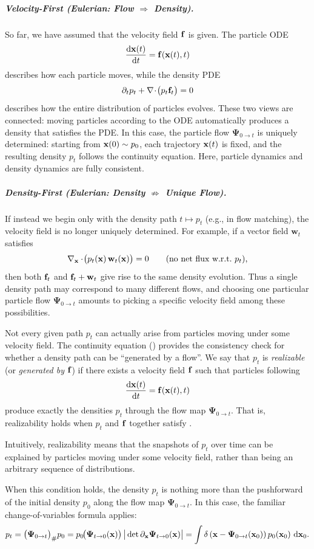 \subparagraph{Velocity-First (Eulerian: Flow $\Rightarrow$ Density).}  
So far, we have assumed that the velocity field ${\mathbf{f}}$ is given.  
The particle ODE
\[
\frac{\mathop{}\!\mathrm{d} {\mathbf{x}}(t)}{\mathop{}\!\mathrm{d} t} = {\mathbf{f}}({\mathbf{x}}(t), t)
\]
describes how each particle moves, while the density PDE
\[
\partial_t p_t + \nabla \!\cdot \!\big(p_t {\mathbf{f}}_t\big) = 0
\]
describes how the entire distribution of particles evolves.  
These two views are connected: moving particles according to the ODE automatically produces a density that satisfies the PDE.  
In this case, the particle flow $\bm{\Psi}_{0\to t}$ is uniquely determined: starting from ${\mathbf{x}}(0)\sim p_0$, each trajectory ${\mathbf{x}}(t)$ is fixed, and the resulting density $p_t$ follows the continuity equation.  
Here, particle dynamics and density dynamics are fully consistent.

\subparagraph{Density-First (Eulerian: Density $\nRightarrow$ Unique Flow).} 
If instead we begin only with the density path $t \mapsto p_t$ (e.g.,  in flow matching), the velocity field is no longer uniquely determined.  
For example, if a vector field $\mathbf w_t$ satisfies
\[
\nabla_{{\mathbf{x}}}\cdot\!\big(p_t({\mathbf{x}})\,\mathbf w_t({\mathbf{x}})\big)=0
\qquad\text{(no net flux w.r.t.\ $p_t$),}
\]
then both ${\mathbf{f}}_t$ and ${\mathbf{f}}_t+\mathbf w_t$ give rise to the same density evolution.  
Thus a single density path may correspond to many different flows, and choosing one particular particle flow $\bm{\Psi}_{0\to t}$ amounts to picking a specific velocity field among these possibilities.

Not every given path $p_t$ can actually arise from particles moving under some velocity field.  
The continuity equation () provides the consistency check for whether a density path can be ``generated by a flow''.  
We say that $p_t$ is \emph{realizable} (or \emph{generated by} ${\mathbf{f}}$) if there exists a velocity field ${\mathbf{f}}$ such that particles following
\[
\dfrac{\mathop{}\!\mathrm{d} {\mathbf{x}}(t)}{\mathop{}\!\mathrm{d} t} = {\mathbf{f}}({\mathbf{x}}(t), t)
\]
produce exactly the densities $p_t$ through the flow map $\bm{\Psi}_{0\to t}$.  That is, realizability holds when $p_t$ and ${\mathbf{f}}$ together satisfy .

Intuitively, realizability means that the snapshots of $p_t$ over time can be explained by particles moving under some velocity field, rather than being an arbitrary sequence of distributions.  



When this condition holds, the density $p_t$ is nothing more than the pushforward of the initial density $p_0$ along the flow map $\bm{\Psi}_{0\to t}$.  
In this case, the familiar change-of-variables formula applies:
\begin{align*}
    p_t = \big(\bm{\Psi}_{0\to t}\big)_{\#} p_0 
= p_0\!\big(\bm{\Psi}_{t\to 0}({\mathbf{x}})\big)\,
   \big|\det \partial_{\mathbf{x}}\bm{\Psi}_{t\to 0}({\mathbf{x}})\big|
= \int \delta \left({\mathbf{x}} - \bm{\Psi}_{0\to t}({\mathbf{x}}_0)\right) 
   p_0({\mathbf{x}}_0)\,\mathop{}\!\mathrm{d}{\mathbf{x}}_0.
\end{align*}





